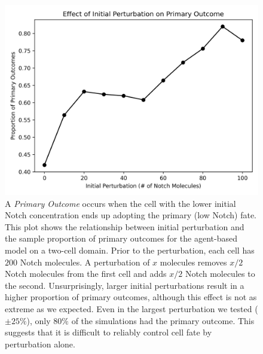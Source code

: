 \documentclass{article}
\begin{document}
\begin{flushleft}
\begin{figure}
  \includegraphics[width=\textwidth]{img/vis12.png}
  \caption{A \emph{Primary Outcome} occurs when the cell with the lower initial Notch concentration ends up adopting the primary (low Notch) fate. This plot shows the relationship between initial perturbation and the sample proportion of primary outcomes for the agent-based model on a two-cell domain. Prior to the perturbation, each cell has $200$ Notch molecules. A perturbation of $x$ molecules removes $x/2$ Notch molecules from the first cell and adds $x/2$ Notch molecules to the second. Unsurprisingly, larger initial perturbations result in a higher proportion of primary outcomes, although this effect is not as extreme as we expected. Even in the largest perturbation we tested ($\pm 25\%$), only $80\%$ of the simulations had the primary outcome. This suggests that it is difficult to reliably control cell fate by perturbation alone.}
\end{figure}


\end{flushleft}
\end{document}
